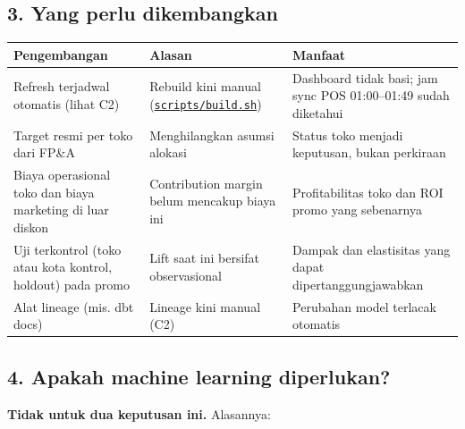 \documentclass[10pt,a4paper]{article}
\begin{document}
\subsection{3. Yang perlu dikembangkan}\label{yang-perlu-dikembangkan}

{\def\LTcaptype{none} %
\begin{longtable}[]{@{}
  >{\raggedright\arraybackslash}p{}
  >{\raggedright\arraybackslash}p{}
  >{\raggedright\arraybackslash}p{}@{}}
\toprule\noalign{}
\begin{minipage}[b]{\linewidth}\raggedright
Pengembangan
\end{minipage} & \begin{minipage}[b]{\linewidth}\raggedright
Alasan
\end{minipage} & \begin{minipage}[b]{\linewidth}\raggedright
Manfaat
\end{minipage} \\
\midrule\noalign{}
\endhead
\bottomrule\noalign{}
\endlastfoot
Refresh terjadwal otomatis (lihat C2) & Rebuild kini manual (\href{https://github.com/titan2903/kirana-omnichannel-performance-intelligence/blob/master/scripts/build.sh}{\texttt{scripts/build.sh}}) & Dashboard tidak basi; jam sync POS 01:00--01:49 sudah diketahui \\
Target resmi per toko dari FP\&A & Menghilangkan asumsi alokasi & Status toko menjadi keputusan, bukan perkiraan \\
Biaya operasional toko dan biaya marketing di luar diskon & Contribution margin belum mencakup biaya ini & Profitabilitas toko dan ROI promo yang sebenarnya \\
Uji terkontrol (toko atau kota kontrol, holdout) pada promo & Lift saat ini bersifat observasional & Dampak dan elastisitas yang dapat dipertanggungjawabkan \\
Alat lineage (mis. dbt docs) & Lineage kini manual (C2) & Perubahan model terlacak otomatis \\
\end{longtable}
}

\subsection{4. Apakah machine learning diperlukan?}\label{apakah-machine-learning-diperlukan}

\textbf{Tidak untuk dua keputusan ini.} Alasannya:
\end{document}
